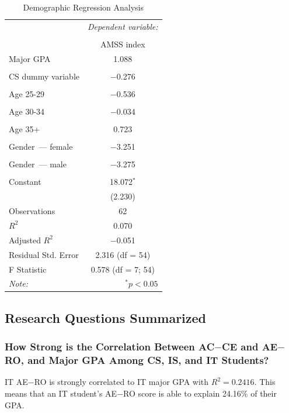 \begin{table}[!htbp] \centering
  \caption{Demographic Regression Analysis}
  \label{tab:c-demographics}
  \begin{tabular}{@{\extracolsep{5pt}}lc}
    \toprule
     & \multicolumn{1}{c}{\textit{Dependent variable:}} \\
    \cline{2-2}
    \\[-1.8ex] & AMSS index \\
    \midrule
    Major GPA & 1.088 \\
    &  \\
    CS dummy variable & $-$0.276 \\
    &  \\
    Age 25-29 & $-$0.536 \\
    &  \\
    Age 30-34 & $-$0.034 \\
    &  \\
    Age 35+ & 0.723 \\
    &  \\
    Gender~--- female & $-$3.251 \\
    &  \\
    Gender~--- male & $-$3.275 \\
    &  \\
    Constant & 18.072$^{*}$ \\
    & (2.230) \\
    \midrule
    Observations & 62 \\
    $R^{2}$ & 0.070 \\
    Adjusted $R^{2}$ & $-$0.051 \\
    Residual Std. Error & 2.316 (df = 54) \\
    F Statistic & 0.578 (df = 7; 54) \\
    \bottomrule
    \textit{Note:}  & \multicolumn{1}{r}{$^{*}p<0.05$} \\
  \end{tabular}
\end{table}

\subsection{Research Questions Summarized}
\subsubsection{How Strong is the Correlation Between AC$-$CE and AE$-$RO, and Major GPA Among CS, IS, and IT Students?}
IT AE$-$RO is strongly correlated to IT major GPA with $R^2=0.2416$. This means that an IT student's AE$-$RO score is able to explain 24.16\% of their GPA.


